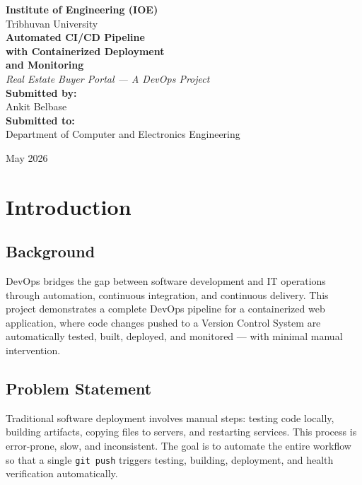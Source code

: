 \documentclass[12pt,a4paper]{article}
\begin{document}
\begin{titlepage}
\centering
\vspace*{2cm}
{\Large\textbf{Institute of Engineering (IOE)}}\\[0.3cm]
{\large Tribhuvan University}\\[1.5cm]

{\Huge\textbf{Automated CI/CD Pipeline}}\\[0.3cm]
{\Huge\textbf{with Containerized Deployment}}\\[0.3cm]
{\Huge\textbf{and Monitoring}}\\[1.5cm]

{\Large\textit{Real Estate Buyer Portal --- A DevOps Project}}\\[2cm]

{\large
\textbf{Submitted by:}\\[0.3cm]
Ankit Belbase\\[1.5cm]

\textbf{Submitted to:}\\[0.3cm]
Department of Computer and Electronics Engineering\\[1.5cm]
}

{\large May 2026}
\end{titlepage}

\section{Introduction}

\subsection{Background}
DevOps bridges the gap between software development and IT operations through automation, continuous integration, and continuous delivery. This project demonstrates a complete DevOps pipeline for a containerized web application, where code changes pushed to a Version Control System are automatically tested, built, deployed, and monitored --- with minimal manual intervention.

\subsection{Problem Statement}
Traditional software deployment involves manual steps: testing code locally, building artifacts, copying files to servers, and restarting services. This process is error-prone, slow, and inconsistent. The goal is to automate the entire workflow so that a single \texttt{git push} triggers testing, building, deployment, and health verification automatically.
\end{document}
